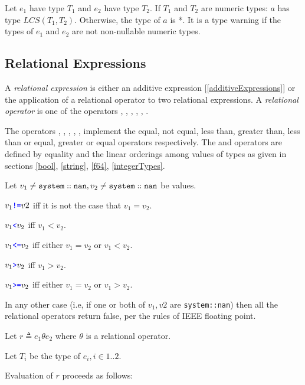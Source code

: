 \documentclass{article}
\begin{document}
{Let $e_1$ have type $T_1$ and $e_2$ have type $T_2$.  If $T_1$ and $T_2$ are  numeric types:
 $a$ has type $LCS(T_1, T_2)$. Otherwise, the type of $a$ is *. It is a type warning if the types of $e_1$ and $e_2$  are not non-nullable numeric types.
 


\subsection{\space Relational Expressions}
\label{relationalExpressions}

A {\em relational expression} is either an additive expression [\ref{additiveExpressions}] or the application of a relational operator to two relational expressions.
A {\em relational operator} is one of the operators \EQ{}, \NEQ{}, \LT{}, \GT{}, \LTE{}, \GTE{}.

The operators \EQ{}, \NEQ{}, \LT{}, \GT{}, \LTE{}, \GTE{} implement the equal, not equal,  less than, greater than,  less than or equal, greater or equal operators respectively. The \EQ{} and \LT{} operators are defined by equality and the linear orderings among values of types as given in sections \ref{bool}, \ref{string}, \ref{f64}, \ref{integerTypes}.



Let $v_1 \ne {\tt system::nan}, v_2 \ne {\tt system::nan}$ be values. 

$v_1 \texttt{\color{blue} !=}{} v2$ iff it is not the case that $v_1 = v_2$.

$v_1 \texttt{\color{blue} \tt<}{} v_2$ iff $v_1 < v_2$.

$v_1 \texttt{\color{blue} \tt<=}{} v_2$ iff either $v_1 = v_2$ or $v_1 < v_2$.

$v_1 \texttt{\color{blue} \tt>}{} v_2$ iff $v_1 > v_2$.

$v_1 \texttt{\color{blue} \tt>=}{} v_2$ iff either $v_1 = v_2$ or $v_1 > v_2$.

In any other case (i.e, if one or both of $v_1, v2$ are {\tt system::nan}) then all the relational operators return false, per the rules of IEEE floating point.



\RelExpression{}
\RelOp{}


Let $r \triangleq e_1 \theta{} e_2$ where $\theta$ is a relational operator.

Let $T_i$ be the type of $e_i, i \in 1..2$.

Evaluation of $r$ proceeds as follows:

}
\end{document}

